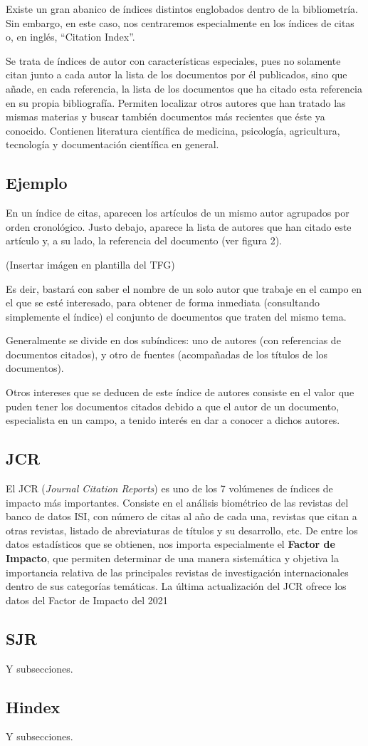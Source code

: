 Existe un gran abanico de índices distintos englobados dentro de la bibliometría. Sin embargo, en este caso, nos centraremos especialmente en los índices de citas o, en inglés, ``Citation Index''.

Se trata de índices de autor con características especiales, pues no solamente citan junto a cada autor la lista de los documentos por él publicados, sino
que añade, en cada referencia, la lista de los documentos que ha citado esta referencia en su propia bibliografía. Permiten localizar otros autores que han tratado las mismas materias y buscar también documentos más recientes que éste ya conocido.
Contienen literatura científica de medicina, psicología, agricultura, tecnología y documentación científica en general. 


\subsection{Ejemplo}

En un índice de citas, aparecen los artículos de un mismo autor agrupados por orden cronológico. Justo debajo, aparece la lista de autores que han citado este artículo y,
a su lado, la referencia del documento (ver figura 2).

	(Insertar imágen en plantilla del TFG)

Es deir, bastará con saber el nombre de un solo autor que trabaje en el campo en el que se esté interesado, para obtener de forma inmediata (consultando simplemente el índice) el conjunto de documentos que traten del mismo tema.

Generalmente se divide en dos subíndices: uno de autores (con referencias de documentos citados), y otro de fuentes (acompañadas de los títulos de los documentos).

Otros intereses que se deducen de este índice de autores consiste en el valor que puden  tener los documentos citados debido a que el autor de un documento, especialista en un campo, a tenido interés en dar a conocer a dichos autores.

\subsection{JCR}
El JCR (\textit{Journal Citation Reports}) es uno de los 7 volúmenes de índices de impacto más importantes. Consiste en el análisis biométrico de las revistas del banco de datos ISI, con número de citas al año de cada una, revistas que citan a otras revistas, listado de abreviaturas de títulos y su desarrollo, etc.
De entre los datos estadísticos que se obtienen, nos importa especialmente el \textbf{Factor de Impacto}, que permiten determinar de una manera sistemática y objetiva la importancia relativa de las principales revistas de investigación internacionales dentro de sus categorías temáticas. 
La última actualización del JCR ofrece los datos del Factor de Impacto del 2021

\subsection{SJR}

Y subsecciones.

\subsection{Hindex}

Y subsecciones.


